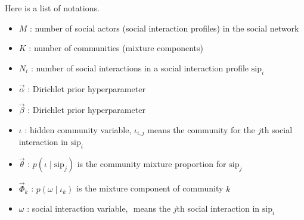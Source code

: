 \documentclass[letterpaper]{article}
\begin{document}
Here is a list of notations.
\begin{itemize}
	\item $ M $ : number of social actors (social interaction profiles) in the social network
	\item $ K $ : number of communities (mixture components)
	\item $ N_{i} $ : number of social interactions in a social interaction profile $ \mbox{sip}_{i} $
	\item $ \vec{\alpha} $ : Dirichlet prior hyperparameter
	\item $ \vec{\beta} $ : Dirichlet prior hyperparameter
	\item $ \iota $ : hidden community variable, $ \iota_{i,j} $ means the community for the $ j $th social interaction in $ \mbox{sip}_{i} $
	\item $ \vec{\theta} $ : $ p(\iota \mid \mbox{sip}_{j}) $ is the community mixture proportion for $ \mbox{sip}_{j} $ 
	\item $ \vec{\Phi}_{k} $ : $ p(\omega \mid \iota_{k} ) $ is the mixture component of community $ k $
	\item $ \omega $ : social interaction variable, $ $ means the $ j $th social interaction in $ \mbox{sip}_{i} $
\end{itemize}



\end{document}
